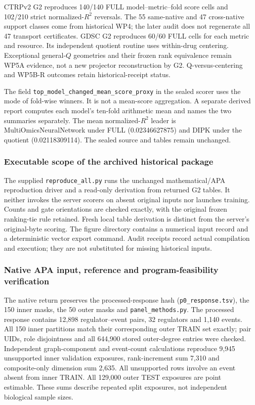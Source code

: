\documentclass[11pt]{article}
\begin{document}
CTRPv2 G2 reproduces 140/140 FULL model--metric--fold score cells and 102/210 strict normalized-$R^2$ reversals. The 55 same-native and 47 cross-native support classes come from historical WP4; the later audit does not regenerate all 47 transport certificates. GDSC G2 reproduces 60/60 FULL cells for each metric and resource. Its independent quotient routine uses within-drug centering. Exceptional general-$Q$ geometries and their frozen rank equivalence remain WP5A evidence, not a new projector reconstruction by G2. Q-versus-centering and WP5B-R outcomes retain historical-receipt status.

The field \texttt{top\_model\_changed\_mean\_score\_proxy} in the sealed scorer uses the mode of fold-wise winners. It is not a mean-score aggregation. A separate derived report computes each model's ten-fold arithmetic mean and names the two summaries separately. The mean normalized-$R^2$ leader is MultiOmicsNeuralNetwork under FULL (0.02346627875) and DIPK under the quotient (0.02118309114). The sealed source and tables remain unchanged.

\subsubsection{Executable scope of the archived historical package}
The supplied \texttt{reproduce\_all.py} runs the unchanged mathematical/APA reproduction driver and a read-only derivation from returned G2 tables. It neither invokes the server scorers on absent original inputs nor launches training. Counts and gate orientations are checked exactly, with the original frozen ranking-tie rule retained. Fresh local table derivation is distinct from the server's original-byte scoring. The figure directory contains a numerical input record and a deterministic vector export command. Audit receipts record actual compilation and execution; they are not substituted for missing historical inputs.


\subsubsection{Native APA input, reference and program-feasibility verification}
The native return preserves the processed-response hash (\texttt{p0\_response.tsv}), the 150 inner masks, the 50 outer masks and \texttt{panel\_methods.py}. The processed response contains 12,898 regulator--event pairs, 32 regulators and 1,140 events. All 150 inner partitions match their corresponding outer TRAIN set exactly; pair UIDs, role disjointness and all 644,900 stored outer-degree entries were checked. Independent graph-component and event-count calculations reproduce 9,945 unsupported inner validation exposures, rank-increment sum 7,310 and composite-only dimension sum 2,635. All unsupported rows involve an event absent from inner TRAIN. All 129,000 outer TEST exposures are point estimable. These sums describe repeated split exposures, not independent biological sample sizes.
\end{document}
